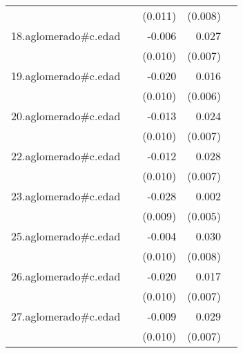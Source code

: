 {\begin{longtable}{l*{4}{D{.}{.}{-1}}}
            &                     &     (0.011)         &     (0.008)         &                     \\
\addlinespace
18.aglomerado#c.edad&                     &      -0.006         &       0.027\sym{***}&                     \\
            &                     &     (0.010)         &     (0.007)         &                     \\
\addlinespace
19.aglomerado#c.edad&                     &      -0.020\sym{*}  &       0.016\sym{**} &                     \\
            &                     &     (0.010)         &     (0.006)         &                     \\
\addlinespace
20.aglomerado#c.edad&                     &      -0.013         &       0.024\sym{**} &                     \\
            &                     &     (0.010)         &     (0.007)         &                     \\
\addlinespace
22.aglomerado#c.edad&                     &      -0.012         &       0.028\sym{***}&                     \\
            &                     &     (0.010)         &     (0.007)         &                     \\
\addlinespace
23.aglomerado#c.edad&                     &      -0.028\sym{**} &       0.002         &                     \\
            &                     &     (0.009)         &     (0.005)         &                     \\
\addlinespace
25.aglomerado#c.edad&                     &      -0.004         &       0.030\sym{***}&                     \\
            &                     &     (0.010)         &     (0.008)         &                     \\
\addlinespace
26.aglomerado#c.edad&                     &      -0.020\sym{*}  &       0.017\sym{*}  &                     \\
            &                     &     (0.010)         &     (0.007)         &                     \\
\addlinespace
27.aglomerado#c.edad&                     &      -0.009         &       0.029\sym{***}&                     \\
            &                     &     (0.010)         &     (0.007)         &                     \\

\end{longtable}}
